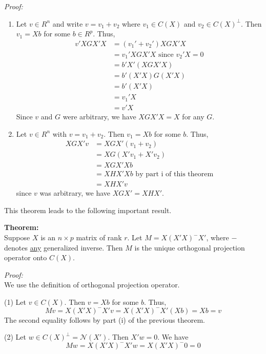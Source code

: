 \documentclass[12pt]{article}
\numberwithin{equation}{section}
\begin{document}
\textit{Proof:} \\
\begin{enumerate}
  \item Let $v \in R^n$ and write $v = v_1 + v_2$ where $v_1 \in C(X)$ and $v_2 \in C(X)^{\perp}$. Then $v_1 = Xb$ for some $b \in R^p$. Thus,
  \begin{align*}
    v'XGX'X &= (v_1' + v_2')XGX'X \\
      &= v_1' XGX'X \text{ since } v_2'X = 0 \\
      &= b' X' (XGX'X) \\
      &= b' (X'X) G (X'X) \\
      &= b' (X'X) \\
      &= v_1' X \\
      &= v' X
  \end{align*}
  Since $v$ and $G$ were arbitrary, we have $XGX'X = X$ for any $G$.
  \item Let $v \in R^n$ with $v = v_1 + v_2$. Then $v_1 = Xb$ for some $b$. Thus,
  \begin{align*}
    XGX'v &= XGX'(v_1 + v_2) \\
      &= XG(X'v_1 + X'v_2) \\
      &= XGX'Xb \\
      &= XHX'Xb \text{ by part i of this theorem} \\
      &= XHX'v
  \end{align*}
  since $v$ was arbitrary, we have $XGX' = XHX'$.
\end{enumerate}
  
This theorem leads to the following important result.

\textbf{Theorem:} \\
Suppose $X$ is an $n \times p$ matrix of rank $r$. Let $M = X (X'X)^- X'$, where $-$ denotes \underline{any} generalized inverse. Then $M$ is the unique orthogonal projection operator onto $C(X)$.

\textit{Proof:} \\
We use the definition of orthogonal projection operator.

(1) Let $v \in C(X)$. Then $v = Xb$ for some $b$. Thus,
\begin{equation*}
  Mv = X (X'X)^- X'v = X (X'X)^- X' (Xb) = Xb = v
\end{equation*}
The second equality follows by part (i) of the previous theorem.

(2) Let $w \in C(X)^{\perp} = \mathcal{N}(X')$. Then $X'w = 0$. We have
\begin{equation*}
  Mw = X (X'X)^- X'w = X (X'X)^- 0 = 0
\end{equation*}
\end{document}
